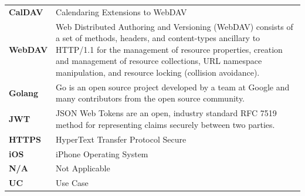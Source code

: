 \documentclass[12pt,a4paper,twoside]{report}
\begin{document}
\begin{singlespace}
\begin{center}
\begin{longtable}{p{}p{}}
            \textbf{CalDAV}           & Calendaring Extensions to WebDAV                                                                                                                                             \\[1ex]

            \textbf{WebDAV}           & Web Distributed Authoring and Versioning (WebDAV) consists of a set
            of methods, headers, and content-types ancillary to HTTP/1.1 for the
            management of resource properties, creation and management of
            resource collections, URL namespace manipulation, and resource
            locking (collision avoidance). \cite{def:WebDAV}                                                                                                                                                         \\[1ex]

            \textbf{Golang}           & Go is an open source project developed by a team at Google and many contributors from the open source community. \cite{def:Golang}                                           \\[1ex]

            \textbf{JWT}              & JSON Web Tokens are an open, industry standard RFC 7519 method for representing claims securely between two parties. \cite{def:JWT}                                          \\[1ex]

            \textbf{HTTPS}            & HyperText Transfer Protocol Secure                                                                                                                                           \\[1ex]

            \textbf{iOS}              & iPhone Operating System                                                                                                                                                      \\[1ex]

            \textbf{N/A}              & Not Applicable                                                                                                                                                               \\[1ex]

            \textbf{UC}               & Use Case                                                                                                                                                                     \\[1ex]


\end{longtable}
\end{center}
\end{singlespace}
\end{document}

